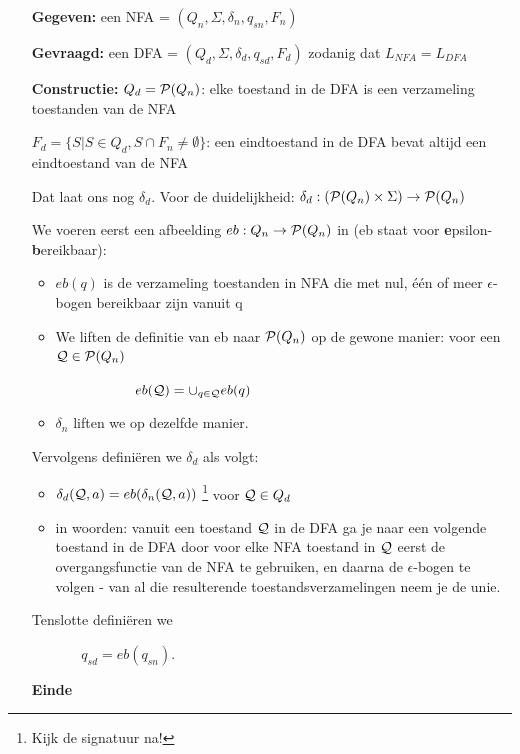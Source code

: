 \begin{itemize}
\item[{\bf Gegeven:}] een NFA = $(Q_n,\Sigma,\delta_n,q_{sn},F_n)$

\item[{\bf Gevraagd:}] een DFA = $(Q_d,\Sigma,\delta_d,q_{sd},F_d)$ zodanig dat
$L_{NFA} = L_{DFA}$

\item[{\bf Constructie:}] 
$Q_d = {\cal P}(Q_n)$: elke toestand in de DFA is een verzameling
toestanden van de NFA

$F_d = \{S |S \in Q_d, S \cap F_n \neq \emptyset\}$: een eindtoestand
in de DFA bevat altijd een eindtoestand van de NFA

Dat laat ons nog $\delta_d$. Voor de duidelijkheid: 
%
$\delta_d :  ({\cal P}(Q_n) \times \Sigma) \rightarrow {\cal P}(Q_n)$


We voeren eerst een afbeelding $eb : Q_n \rightarrow {\cal P}(Q_n)$ in
(eb staat voor {\bf e}psilon-{\bf b}ereikbaar):

\begin{itemize}
\item $eb(q)$ is de verzameling toestanden in NFA die met nul,
\'{e}\'{e}n of meer $\epsilon$-bogen bereikbaar zijn vanuit q

\item 
We liften de definitie van eb naar ${\cal P}(Q_n)$ op de gewone
manier: voor een ${\cal Q} \in {\cal P}(Q_n)$

$~~~~~~~~~~~~~~~~~eb({\cal Q}) = \cup_{q \in {\cal Q}} eb(q)$

\item 
 $\delta_n$ liften we op dezelfde manier.
\end{itemize}



Vervolgens defini\"eren we $\delta_d$ als volgt:
\begin{itemize}
\item 
$\delta_d({\cal Q},a) = eb(\delta_n({\cal Q},a))$ \footnote{Kijk de
signatuur na!} voor ${\cal Q} \in Q_d$

\item 
in woorden: vanuit een toestand ${\cal Q}$ in de DFA ga je naar een
volgende toestand in de DFA door voor elke NFA toestand in ${\cal Q}$
eerst de overgangsfunctie van de NFA te gebruiken, en daarna de
$\epsilon$-bogen te volgen - van al die resulterende
toestandsverzamelingen neem je de unie.

\end{itemize}



Tenslotte defini\"eren we


$~~~~~~~~~~~~~~~~q_{sd} = eb({q_{sn}})$.


\item[{\bf Einde}]
\end{itemize}


